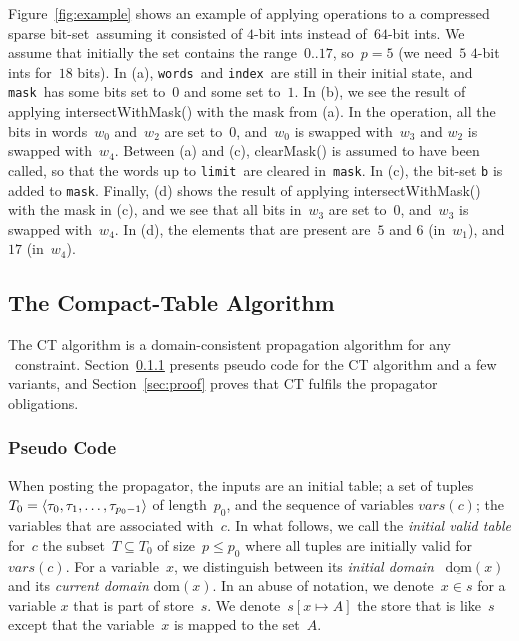 \documentclass[a4paper,11pt]{article}
\newcommand{\T}[1]{\texttt{#1}}
\newcommand{\Secref}[1]{Section~\ref{#1}}
\newcommand{\Table}{\Constraint{Table}}
\newcommand{\Dom}[1]{\text{dom}({#1})}
\newcommand{\Dominit}[1]{\underline{\text{dom}}(#1)}
\newcommand{\Words}{\texttt{words}}
\newcommand{\Index}{\texttt{index}}
\newcommand{\Mask}{\texttt{mask}}
\newcommand{\Limit}{\texttt{limit}}
\newcommand{\bitset}[0]{compressed sparse bit-set}
\numberwithin{equation}{section}
\begin{document}
Figure~\ref{fig:example} shows an example of applying operations to a 
\bitset~assuming it consisted of $4$-bit ints instead of~$64$-bit ints.
We assume that initially the set contains the range~$0..17$, so~$p = 5$
(we need~$5$ $4$-bit ints for~$18$ bits). In (a), \Words~and \Index~are
still in their initial state, and \Mask~has some bits set to~$0$ and some
set to~$1$. In (b), we see the result of applying intersectWithMask() with
the mask from (a). In the operation, all the bits in words~$w_0$
and~$w_2$ are set to~$0$, and~$w_0$ is swapped with~$w_3$ and $w_2$
is swapped with~$w_4$.
Between (a) and (c), clearMask() is assumed to have been called,
so that the words up to \Limit~are cleared in~\Mask.
In (c), the bit-set \T{b} is added to \Mask.
Finally, (d) shows the result of applying intersectWithMask() with
the mask in (c), and we see that all bits in~$w_3$ are set to~$0$,
and~$w_3$ is swapped with~$w_4$. In (d), the elements that are present
are~$5$ and $6$ (in~$w_1$), and~$17$ (in~$w_4$).




\subsection{The Compact-Table Algorithm}
\label{sec:ct}
The CT algorithm is a domain-consistent propagation
algorithm for any \Table~constraint. \Secref{ct:pseudo}
presents pseudo code for the CT algorithm and a few variants,
and \Secref{sec:proof} proves that CT fulfils the propagator
obligations.

\subsubsection{Pseudo Code}
\label{ct:pseudo}

When posting the propagator, the inputs are an initial table;
a set of tuples $T_0 = \left\langle\tau_0, \tau_1, \ldots, \tau_{p_0-1}\right\rangle$ of
length~$p_0$, and the sequence of variables $\mathit{vars}(c)$; 
the variables that are associated with~$c$.
In what follows, we call the \emph{initial valid table}
for~$c$ the subset~$T \subseteq T_0$ of size~$p \leq p_0$ where all
tuples are initially valid for~$\mathit{vars}(c)$.
For a variable~$x$, we distinguish between its \emph{initial domain}
~$\Dominit{x}$ and its \emph{current domain} $\Dom{x}$.
In an abuse of notation, we denote~$x \in s$ for a variable
$x$ that is part of store~$s$. We denote~$s[x \mapsto A]$
the store that is like~$s$ except that the variable~$x$ is mapped
to the set~$A$.
\end{document}
